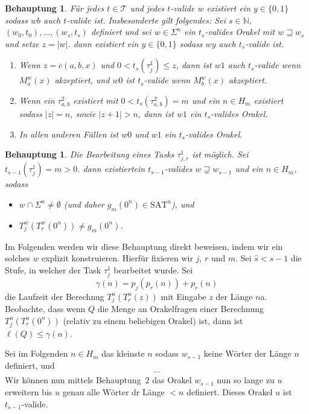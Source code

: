 \documentclass[nofonts]{uebung}
\newtheorem{claim}[theorem]{Behauptung}
\def\SAT{\ensuremath{\mathrm{SAT}}}
\begin{document}
\begin{claim}
    Für jedes $t\in\mathcal T$ und jedes $t$-valide $w$ existiert ein $y\in\{0,1\}$ sodass $wb$ auch $t$-valide ist.
    Insbesonderte gilt folgendes: Sei $s\in\mathbb N$, $(w_0, t_0), \dots, (w_s,t_s)$ definiert und sei $w\in \Sigma^n$ ein $t_s$-valides Orakel mit $w\sqsupseteq w_s$ und setze $z=|w|$. dann existiert ein $y\in\{0,1\}$ sodass $wy$ auch $t_s$-valide ist.
    \begin{enumerate}[label=(\roman*)]
        \item Wenn $z=c(a,b,x)$ und $0<t_s(\tau^1_j)\leq z$, dann ist $w1$ auch $t_s$-valide wenn $M_a^w(x)$ akzeptiert,
            und $w0$ ist $t_s$-valide wenn $M_b^w(x)$ akzeptiert.
        \item Wenn ein $\tau^2_{a,b}$ existiert mit $0<t_s(\tau^2_{a,b})=m$ und ein $n\in H_m$ existiert sodass $|z|=n$, sowie $|z+1|>n$, dann ist $w1$ ein $t_s$-valides Orakel.
        \item In allen anderen Fällen ist $w0$ und $w1$ ein $t_s$-valides Orakel.
    \end{enumerate}
\end{claim}

\begin{claim}
    Die Bearbeitung eines Tasks $\tau^1_{j,r}$ ist möglich. Sei $t_{s-1}(\tau^1_{j})=m>0$. dann existiertein $t_{s-1}$-valides $w\sqsupsetneq w_{s-1}$ und ein $n\in H_m$, sodass
    \begin{itemize}[nosep]
        \item $w\cap\Sigma^n\neq \emptyset$ (und daher $g_m(0^n)\in\SAT^u$), und
        \item $T_j^w(T_r^w(0^n))\neq g_m(0^n)$.
    \end{itemize}
\end{claim}
Im Folgenden werden wir diese Behauptung direkt beweisen, indem wir ein solches $w$ explizit konstruieren. Hierfür fixieren wir $j$, $r$ und $m$.
Sei $\hat{s}<s-1$ die Stufe, in welcher der Task $\tau^1_j$ bearbeitet wurde.
Sei
\[ \gamma(n) = p_j(p_r(n))+p_r(n) \]
die Laufzeit der Berechnug $T_j^u(T_r^u(z))$ mit Eingabe $z$ der Länge $n$a.
Beobachte, dass wenn $Q$ die Menge an Orakelfragen einer Berechnung $T_j^u(T_r^u(0^n))$ (relativ zu einem beliebigen Orakel) ist, dann ist $\ell(Q)\leq \gamma(n)$.

Sei im Folgenden $n\in H_m$ das kleinste $n$ sodass $w_{s-1}$ keine Wörter der Länge $n$ definiert, und 
\[ \cdots \tag{\ast} \]
Wir können nun mittels Behauptung~2 das Orakel $w_{s-1}$ nun so lange zu $u$ erweitern bis $u$ genau alle Wörter dr Länge $<n$ definiert. Dieses Orakel $u$ ist $t_{s-1}$-valide.
\end{document}
